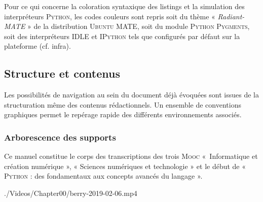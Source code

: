 Pour ce qui concerne la coloration syntaxique des listings et la simulation des interpréteurs \textsc{Python}, les codes couleurs sont repris soit du thème « \textit{Radiant-MATE} » de la distribution \textsc{Ubuntu} MATE, soit du module \textsc{Python} \textsc{Pygments}, soit des interpréteurs IDLE et \textsc{IPython} tels que configurés par défaut sur la plateforme (cf. infra).


\subsection*{Structure et contenus}

Les possibilités de navigation au sein du document déjà évoquées sont issues de la structuration même des contenus rédactionnels. Un ensemble de conventions graphiques permet le repérage rapide des différents environnements associés. 

\subsubsection*{Arborescence des supports}

Ce manuel constitue le corps des transcriptions des trois \textsc{Mooc} «~Informatique et création numérique », « Sciences numériques et technologie » et le début de « \textsc{Python} : des fondamentaux aux concepts avancés du langage ». %

\setcounter{video}{-1}
\begin{marginvideo*}%
		{./Videos/Chapter00/berry-2019-02-06.mp4}%
\end{marginvideo*}

